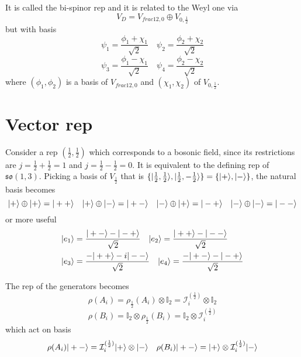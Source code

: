     It is called the bi-spinor rep and it is related to the Weyl one via 
    \begin{equation*}
        V_D = V_{frac{1}{2}, 0} \oplus V_{0, \frac{1}{2}}
    \end{equation*}
    but with basis 
    \begin{equation*}
        \psi_1 = \frac{\phi_1 + \chi_1}{\sqrt 2} \quad \psi_2 = \frac{\phi_2 + \chi_2}{\sqrt 2} 
    \end{equation*}
    \begin{equation*}
        \psi_3 = \frac{\phi_1 - \chi_1}{\sqrt 2} \quad \psi_4 = \frac{\phi_2 - \chi_2}{\sqrt 2}
    \end{equation*}
    where $(\phi_1, \phi_2)$ is a basis of $V_{frac{1}{2}, 0}$ and $(\chi_1, \chi_2)$ of $V_{0, \frac{1}{2}}$.

\section{Vector rep}

    Consider a rep $(\frac{1}{2}, \frac{1}{2})$ which corresponds to a bosonic field, since its restrictions are $j = \frac{1}{2} + \frac{1}{2} = 1$ and $j = \frac{1}{2} - \frac{1}{2} = 0$. It is equivalent to the defining rep of $\mathfrak{so}(1,3)$. Picking a basis of $V_{\frac{1}{2}}$ that is $\{\vert\frac{1}{2}, \frac{1}{2}\rangle, \vert\frac{1}{2}, -\frac{1}{2}\rangle\} = \{\vert+\rangle, \vert-\rangle\}$, the natural basis becomes 
    \begin{equation*}
        \vert+\rangle \oplus \vert+\rangle = \vert++\rangle \quad \vert+\rangle \oplus \vert-\rangle = \vert+-\rangle \quad \vert-\rangle \oplus \vert+\rangle = \vert-+\rangle \quad \vert-\rangle \oplus \vert-\rangle = \vert--\rangle
    \end{equation*}
    or more useful 
    \begin{equation*}
    \begin{aligned}
        & \vert e_1\rangle = \frac{\vert+-\rangle - \vert-+\rangle}{\sqrt 2} \quad \vert e_2\rangle = \frac{\vert++\rangle - \vert--\rangle}{\sqrt 2} \\ & \vert e_3\rangle = \frac{- \vert++\rangle - i\vert--\rangle}{\sqrt 2} \quad \vert e_4\rangle = \frac{- \vert+-\rangle - \vert-+\rangle}{\sqrt 2}
    \end{aligned}
    \end{equation*}

    The rep of the generators becomes 
    \begin{equation*}
        \rho(A_i) = \rho_{\frac{1}{2}} (A_i) \otimes \mathbb I_2  = \mathcal I_i^{(\frac{1}{2})} \otimes \mathbb I_2
    \end{equation*}
    \begin{equation*}
        \rho(B_i) = \mathbb I_2 \otimes \rho_{\frac{1}{2}} (B_i) = \mathbb I_2 \otimes \mathcal I_i^{(\frac{1}{2})} 
    \end{equation*}
    which act on basis 
    \begin{equation*}
        \rho(A_i) \vert+-\rangle = \mathcal I_i^{(\frac{1}{2})} \vert+\rangle \otimes \vert-\rangle \quad \rho(B_i) \vert+-\rangle = \vert+\rangle \otimes \mathcal I_i^{(\frac{1}{2})}  \vert-\rangle 
    \end{equation*}

